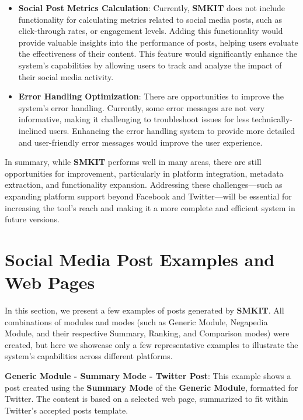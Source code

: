 \begin{itemize}
    \item \textbf{Social Post Metrics Calculation}: 
    Currently, \textbf{SMKIT} does not include functionality for calculating metrics related to social media posts, such as click-through rates, or engagement levels. Adding this functionality would provide valuable insights into the performance of posts, helping users evaluate the effectiveness of their content. This feature would significantly enhance the system's capabilities by allowing users to track and analyze the impact of their social media activity.
    
    \item \textbf{Error Handling Optimization}: There are opportunities to improve the system’s error handling. Currently, some error messages are not very informative, making it challenging to troubleshoot issues for less technically-inclined users. Enhancing the error handling system to provide more detailed and user-friendly error messages would improve the user experience.
\end{itemize}

In summary, while \textbf{SMKIT} performs well in many areas, there are still opportunities for improvement, particularly in platform integration, metadata extraction, and functionality expansion. Addressing these challenges—such as expanding platform support beyond Facebook and Twitter—will be essential for increasing the tool's reach and making it a more complete and efficient system in future versions.


\section{Social Media Post Examples and Web Pages}
\label{sec:social_media_post_examples}
In this section, we present a few examples of posts generated by \textbf{SMKIT}. All combinations of modules and modes (such as Generic Module, Negapedia Module, and their respective Summary, Ranking, and Comparison modes) were created, but here we showcase only a few representative examples to illustrate the system's capabilities across different platforms.

\textbf{Generic Module - Summary Mode - Twitter Post}:  
This example shows a post created using the \textbf{Summary Mode} of the \textbf{Generic Module}, formatted for Twitter. The content is based on a selected web page, summarized to fit within Twitter’s accepted posts template.

